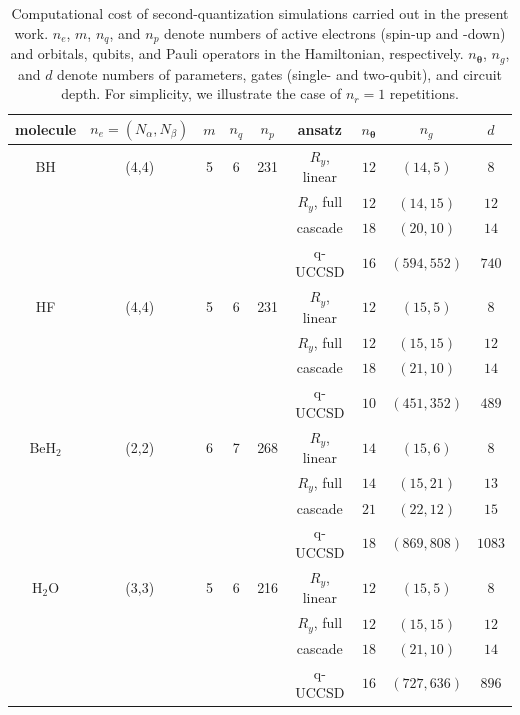 \documentclass[aps,pra,onecolumn]{revtex4-2}
\newcommand{\bgreek}[1]{{\boldsymbol{#1}}}
\newcommand{\ry}{R_y}
\begin{document}
\begin{table}[t!]
\begin{tabular}{ccccc|cccc}
\hline\hline
molecule & $n_e=(N_\alpha,N_\beta)$ & $m$ & $n_q$ & $n_p$ & ansatz & $n_{\bgreek{\theta}}$ & $n_g$ & $d$ \\ 
\hline
BH & (4,4) & 5 & 6 & 231 & $\ry$, linear & $12$ & $(14,5)$ & $8$ \\ 
  &   &  &   &   & $\ry$, full & $12$ & $(14,15)$ & $12$ \\ 
  &   &  &   &   & cascade & $18$ & $(20,10)$ & $14$ \\ 
  &   &  &   &   & q-UCCSD & $16$ & $(594, 552)$ & $740$ \\ 
\hline
HF & (4,4) & 5 & 6 & 231 & $\ry$, linear & $12$ & $(15, 5)$ & $8$ \\ 
  &   &  &   &   & $\ry$, full & $12$ & $(15, 15)$ & $12$ \\ 
  &   &  &   &   & cascade & $18$ & $(21,10)$ & $14$ \\ 
  &   &  &   &   & q-UCCSD & $10$ & $(451, 352)$ & $489$ \\ 
\hline
BeH$_2$ & (2,2) & 6 & 7 & 268 & $\ry$, linear & $14$ & $(15, 6)$ & $8$ \\ 
  &   &  &   &   & $\ry$, full & $14$ & $(15, 21)$ & $13$ \\ 
  &   &  &   &   & cascade & $21$ & $(22,12)$ & $15$ \\ 
  &   &  &   &   & q-UCCSD & $18$ & $(869, 808)$ & $1083$ \\ 
\hline
H$_2$O & (3,3) & 5 & 6 & 216 & $\ry$, linear & $12$ & $(15, 5)$ & $8$ \\ 
  &   &  &   &   & $\ry$, full & $12$ & $(15, 15)$ & $12$ \\ 
  &   &  &   &   & cascade & $18$ & $(21,10)$ & $14$ \\ 
  &   &  &   &   & q-UCCSD & $16$ & $(727, 636)$ & $896$ \\ 
\hline\hline
\end{tabular}
\caption{Computational cost of second-quantization simulations carried out in the present work. 
$n_e$, $m$, $n_q$, and $n_p$ denote numbers of active electrons (spin-up and -down) and orbitals, qubits, and Pauli operators in the Hamiltonian, respectively.
$n_{\bgreek{\theta}}$, $n_g$, and $d$ denote numbers of parameters, gates (single- and two-qubit), and circuit depth. For simplicity, we illustrate the case of $n_r=1$ repetitions.}
\label{table:computational_cost}
\end{table}
\end{document}
